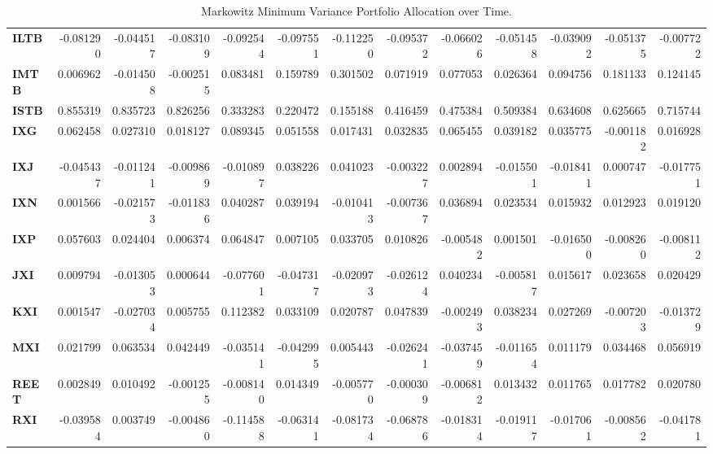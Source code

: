 \begin{table}[h!]
{\begin{tabular}{lrrrrrrrrrrrr}
        \textbf{ILTB} & -0.081290 & -0.044517 & -0.083109 & -0.092544 & -0.097551 & -0.112250 & -0.095372 & -0.066026 & -0.051458 & -0.039092 & -0.051375 & -0.007722 \\
        \textbf{IMTB} & 0.006962  & -0.014508 & -0.002515 & 0.083481  & 0.159789  & 0.301502  & 0.071919  & 0.077053  & 0.026364  & 0.094756  & 0.181133  & 0.124145  \\
        \textbf{ISTB} & 0.855319  & 0.835723  & 0.826256  & 0.333283  & 0.220472  & 0.155188  & 0.416459  & 0.475384  & 0.509384  & 0.634608  & 0.625665  & 0.715744  \\
        \textbf{IXG}  & 0.062458  & 0.027310  & 0.018127  & 0.089345  & 0.051558  & 0.017431  & 0.032835  & 0.065455  & 0.039182  & 0.035775  & -0.001182 & 0.016928  \\
        \textbf{IXJ}  & -0.045437 & -0.011241 & -0.009869 & -0.010897 & 0.038226  & 0.041023  & -0.003227 & 0.002894  & -0.015501 & -0.018411 & 0.000747  & -0.017751 \\
        \textbf{IXN}  & 0.001566  & -0.021573 & -0.011836 & 0.040287  & 0.039194  & -0.010413 & -0.007367 & 0.036894  & 0.023534  & 0.015932  & 0.012923  & 0.019120  \\
        \textbf{IXP}  & 0.057603  & 0.024404  & 0.006374  & 0.064847  & 0.007105  & 0.033705  & 0.010826  & -0.005482 & 0.001501  & -0.016500 & -0.008260 & -0.008112 \\
        \textbf{JXI}  & 0.009794  & -0.013053 & 0.000644  & -0.077601 & -0.047317 & -0.020973 & -0.026124 & 0.040234  & -0.005817 & 0.015617  & 0.023658  & 0.020429  \\
        \textbf{KXI}  & 0.001547  & -0.027034 & 0.005755  & 0.112382  & 0.033109  & 0.020787  & 0.047839  & -0.002493 & 0.038234  & 0.027269  & -0.007203 & -0.013729 \\
        \textbf{MXI}  & 0.021799  & 0.063534  & 0.042449  & -0.035141 & -0.042995 & 0.005443  & -0.026241 & -0.037459 & -0.011654 & 0.011179  & 0.034468  & 0.056919  \\
        \textbf{REET} & 0.002849  & 0.010492  & -0.001255 & -0.008140 & 0.014349  & -0.005770 & -0.000309 & -0.006812 & 0.013432  & 0.011765  & 0.017782  & 0.020780  \\
        \textbf{RXI}  & -0.039584 & 0.003749  & -0.004860 & -0.114588 & -0.063141 & -0.081734 & -0.068786 & -0.018314 & -0.019117 & -0.017061 & -0.008562 & -0.041781
    \end{tabular}}
    \caption{Markowitz Minimum Variance Portfolio Allocation over Time.}
\end{table}

